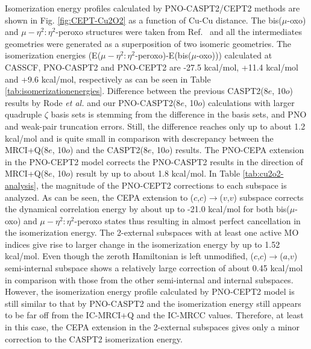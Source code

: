 \documentclass[aip,jcp,amsmath]{revtex4-1}
\begin{document}
%
Isomerization energy profiles calculated by PNO-CASPT2/CEPT2 methods are shown in Fig. \ref{fig:CEPT-Cu2O2} as a function of Cu-Cu distance.
%
The bis($\mu$-oxo) and $\mu-\eta^2:\eta^2$-peroxo structures were taken from Ref.~ and all the intermediates geometries were generated as a superposition of two isomeric geometries.
%
The isomerization energies (E($\mu-\eta^2:\eta^2$-peroxo)-E(bis($\mu$-oxo))) calculated at CASSCF, PNO-CASPT2 and PNO-CEPT2 are -27.5 kcal/mol, +11.4 kcal/mol and +9.6 kcal/mol, respectively as can be seen in Table \ref{tab:isomerizationenergies}.
%
Difference between the previous CASPT2(8$e$, 10$o$) results by Rode {\it et al.} and our PNO-CASPT2(8$e$, 10$o$) calculations with larger quadruple $\zeta$ basis sets is stemming from the difference in the basis sets, and PNO and weak-pair truncation errors. 
%
Still, the difference reaches only up to about 1.2 kcal/mol and is quite small in comparison with descrepancy between the MRCI+Q(8$e$, 10$o$) and the CASPT2(8$e$, 10$o$) results.
%
The PNO-CEPA extension in the PNO-CEPT2 model corrects the PNO-CASPT2 results in the direction of MRCI+Q(8$e$, 10$o$) result by up to about 1.8 kcal/mol.
%
In Table \ref{tab:cu2o2-analysis}, the magnitude of the PNO-CEPT2 corrections to each subspace is analyzed.
%
As can be seen, the CEPA extension to ($c$,$c$)$\rightarrow$($v$,$v$) subspace corrects the dynamical correlation energy by about up to -21.0 kcal/mol for both bis($\mu$-oxo) and $\mu-\eta^2:\eta^2$-peroxo states thus resulting in almost perfect cancellation in the isomerization energy.
%
The 2-external subspaces with at least one active MO indices give rise to larger change in the isomerization energy by up to 1.52 kcal/mol.
%
Even though the zeroth Hamiltonian is left unmodified, ($c$,$c$)$\rightarrow$($a$,$v$) semi-internal subspace shows a relatively large correction of about 0.45 kcal/mol in comparison with those from the other semi-internal  and internal subspaces.
%
However, the isomerization energy profile calculated by PNO-CEPT2 model is still similar to that by PNO-CASPT2 and the isomerization energy still appears to be far off from the IC-MRCI+Q and the IC-MRCC values.
%
Therefore, at least in this case, the CEPA extension in the 2-external subspaces gives only a minor correction to the CASPT2 isomerization energy. 
\end{document}

